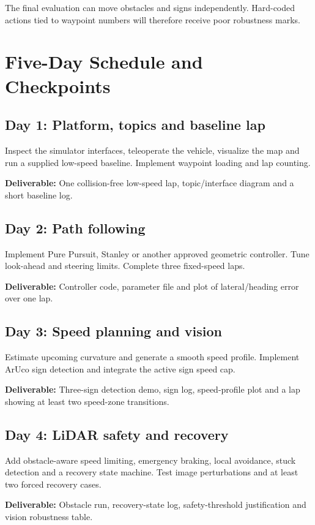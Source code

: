 \documentclass[11pt,a4paper]{article}
\newcommand{\deliverable}[1]{\textbf{Deliverable:} #1}
\begin{document}
The final evaluation can move obstacles and signs independently. Hard-coded actions tied to waypoint numbers will therefore receive poor robustness marks.

\section{Five-Day Schedule and Checkpoints}
\subsection*{Day 1: Platform, topics and baseline lap}
Inspect the simulator interfaces, teleoperate the vehicle, visualize the map and run a supplied low-speed baseline. Implement waypoint loading and lap counting.

\deliverable{One collision-free low-speed lap, topic/interface diagram and a short baseline log.}

\subsection*{Day 2: Path following}
Implement Pure Pursuit, Stanley or another approved geometric controller. Tune look-ahead and steering limits. Complete three fixed-speed laps.

\deliverable{Controller code, parameter file and plot of lateral/heading error over one lap.}

\subsection*{Day 3: Speed planning and vision}
Estimate upcoming curvature and generate a smooth speed profile. Implement ArUco sign detection and integrate the active sign speed cap.

\deliverable{Three-sign detection demo, sign log, speed-profile plot and a lap showing at least two speed-zone transitions.}

\subsection*{Day 4: LiDAR safety and recovery}
Add obstacle-aware speed limiting, emergency braking, local avoidance, stuck detection and a recovery state machine. Test image perturbations and at least two forced recovery cases.

\deliverable{Obstacle run, recovery-state log, safety-threshold justification and vision robustness table.}
\end{document}
